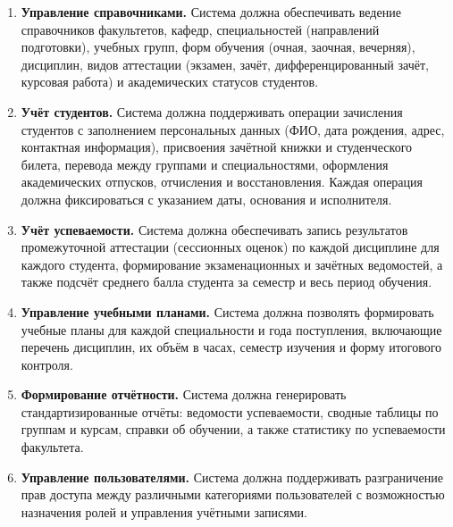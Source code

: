 \documentclass[14pt, a4paper]{extreport}
\begin{document}
\begin{enumerate}
    \item \textbf{Управление справочниками.} Система должна обеспечивать ведение справочников факультетов, кафедр, специальностей (направлений подготовки), учебных групп, форм обучения (очная, заочная, вечерняя), дисциплин, видов аттестации (экзамен, зачёт, дифференцированный зачёт, курсовая работа) и академических статусов студентов.
    \item \textbf{Учёт студентов.} Система должна поддерживать операции зачисления студентов с заполнением персональных данных (ФИО, дата рождения, адрес, контактная информация), присвоения зачётной книжки и студенческого билета, перевода между группами и специальностями, оформления академических отпусков, отчисления и восстановления. Каждая операция должна фиксироваться с указанием даты, основания и исполнителя.
    \item \textbf{Учёт успеваемости.} Система должна обеспечивать запись результатов промежуточной аттестации (сессионных оценок) по каждой дисциплине для каждого студента, формирование экзаменационных и зачётных ведомостей, а также подсчёт среднего балла студента за семестр и весь период обучения.
    \item \textbf{Управление учебными планами.} Система должна позволять формировать учебные планы для каждой специальности и года поступления, включающие перечень дисциплин, их объём в часах, семестр изучения и форму итогового контроля.
    \item \textbf{Формирование отчётности.} Система должна генерировать стандартизированные отчёты: ведомости успеваемости, сводные таблицы по группам и курсам, справки об обучении, а также статистику по успеваемости факультета.
    \item \textbf{Управление пользователями.} Система должна поддерживать разграничение прав доступа между различными категориями пользователей с возможностью назначения ролей и управления учётными записями.
\end{enumerate}
\end{document}
